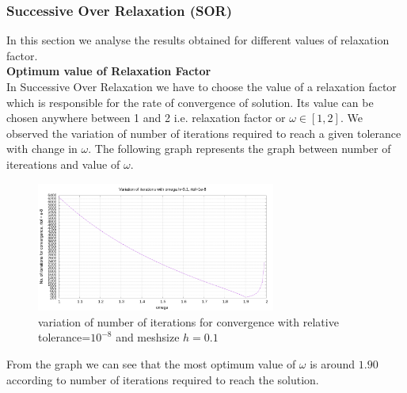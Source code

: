 \subsubsection{Successive Over Relaxation (SOR)}
In this section we analyse the results obtained for different values of relaxation factor. \\[2mm]
\noindent
\textbf{ Optimum value of Relaxation Factor } \\
In Successive Over Relaxation we have to choose the value of a relaxation factor which is responsible for the rate of convergence of solution. Its value can be chosen anywhere between 1 and 2 i.e. relaxation factor or $\omega  \in [1,2]$. We observed the variation of number of iterations required to reach a given tolerance with change in $ \omega $. The following graph represents the graph between number of itereations and value of $\omega$. \\
\begin{figure}[H]
    \centering
    \includegraphics[width=0.7\textwidth]{content/graphs/omega.png}
    \caption{\centering variation of number of iterations for convergence with relative tolerance=$10^{-8}$ and meshsize $h = 0.1$  }
    \label{omega variation}
\end{figure} 
\noindent
From the graph we can see that the most optimum value of $ \omega $ is around $1.90$ according to number of iterations required to reach the solution.

